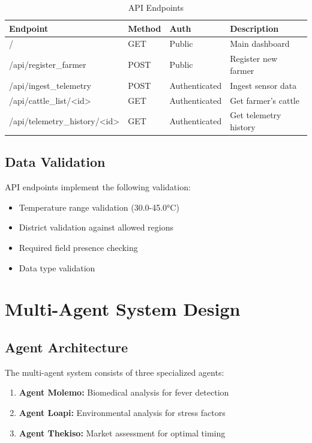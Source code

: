 \begin{table}[H]
\centering
\begin{tabular}{|l|l|l|l|}
\hline
\textbf{Endpoint} & \textbf{Method} & \textbf{Auth} & \textbf{Description} \\
\hline
/ & GET & Public & Main dashboard \\
/api/register\_farmer & POST & Public & Register new farmer \\
/api/ingest\_telemetry & POST & Authenticated & Ingest sensor data \\
/api/cattle\_list/<id> & GET & Authenticated & Get farmer's cattle \\
/api/telemetry\_history/<id> & GET & Authenticated & Get telemetry history \\
\hline
\end{tabular}
\caption{API Endpoints}
\end{table}

\subsection{Data Validation}

API endpoints implement the following validation:

\begin{itemize}
    \item Temperature range validation (30.0-45.0°C)
    \item District validation against allowed regions
    \item Required field presence checking
    \item Data type validation
\end{itemize}

\section{Multi-Agent System Design}

\subsection{Agent Architecture}

The multi-agent system consists of three specialized agents:

\begin{enumerate}
    \item \textbf{Agent Molemo:} Biomedical analysis for fever detection
    \item \textbf{Agent Loapi:} Environmental analysis for stress factors
    \item \textbf{Agent Thekiso:} Market assessment for optimal timing
\end{enumerate}

